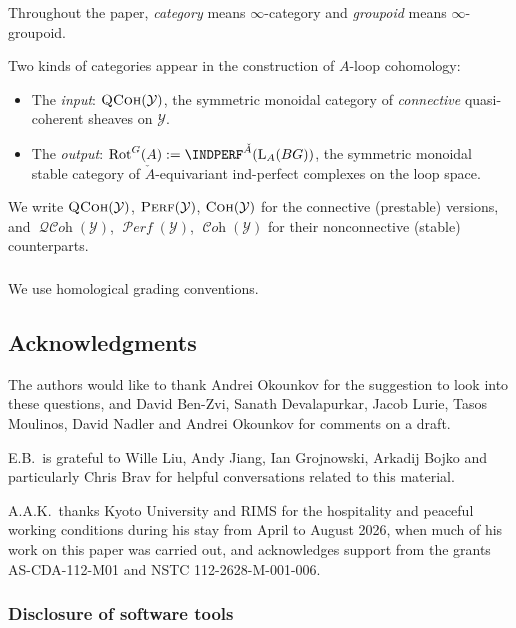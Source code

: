 \documentclass[12pt, oneside]{amsart}
\numberwithin{equation}{section}
\theoremstyle{remark}
\theoremstyle{plain}
\DeclareMathOperator{\QCoh}{\textsc{QCoh}}
\DeclareMathOperator{\QCOH}{\mathcal{QC}\textit{oh}}
\DeclareMathOperator{\Perf}{\textsc{Perf}}
\DeclareMathOperator{\PERF}{\mathcal{P}\textit{erf}}
\DeclareMathOperator{\Coh}{\textsc{Coh}}
\DeclareMathOperator{\COH}{\mathcal{C}\textit{oh}}
\newcommand{\Loop}{\operatorname{L}}
\newcommand{\YY}{\mathcal{Y}}
\newcommand{\Rot}{\operatorname{Rot}}
\begin{document}
\subsubsection{}\label{sssec:intro/conv/io}

Throughout the paper, \emph{category} means $\infty$-category and \emph{groupoid} means $\infty$-groupoid.

Two kinds of categories appear in the construction of $A$-loop cohomology:
\begin{itemize}
\item The \emph{input}: $\QCoh(\YY)$, the symmetric monoidal category of \emph{connective} quasi-coherent sheaves on $\YY$.
\item The \emph{output}: $\Rot^G(A) := \INDPERF^{\check{A}}(\Loop_A(BG))$, the symmetric monoidal stable category of $\check{A}$-equivariant ind-perfect complexes on the loop space.
\end{itemize}
We write $\QCoh(\YY)$, $\Perf(\YY)$, $\Coh(\YY)$ for the connective (prestable) versions, and $\QCOH(\YY)$, $\PERF(\YY)$, $\COH(\YY)$ for their nonconnective (stable) counterparts.

\subsubsection{}

We use homological grading conventions.

\subsection{Acknowledgments}

The authors would like to thank Andrei Okounkov for the suggestion to look into these questions, and David Ben-Zvi, Sanath Devalapurkar, Jacob Lurie, Tasos Moulinos, David Nadler and Andrei Okounkov for comments on a draft.

E.B.\ is grateful to Wille Liu, Andy Jiang, Ian Grojnowski, Arkadij Bojko and particularly Chris Brav for helpful conversations related to this material.

A.A.K.\ thanks Kyoto University and RIMS for the hospitality and peaceful working conditions during his stay from April to August 2026, when much of his work on this paper was carried out, and acknowledges support from the grants AS-CDA-112-M01 and NSTC 112-2628-M-001-006.

\subsubsection*{Disclosure of software tools}
\end{document}
